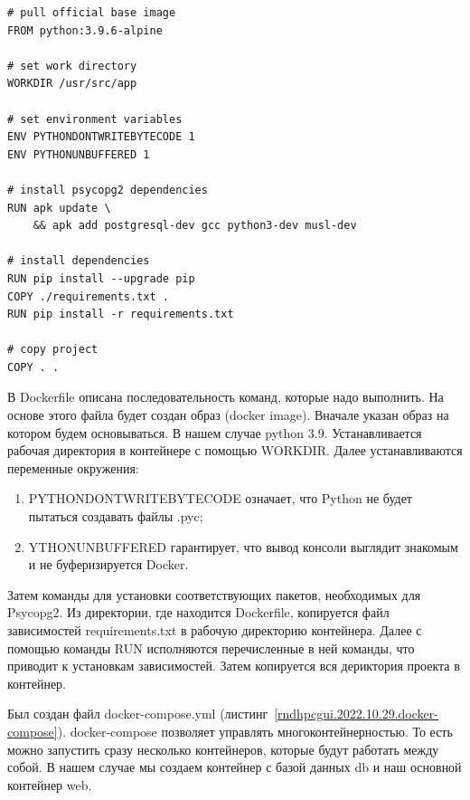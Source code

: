 \begin{lstlisting}[frame=single,label={rndhpcgui.2022.10.29.dockerfile},caption={Dockerfile},language={docker}] 
# pull official base image
FROM python:3.9.6-alpine

# set work directory
WORKDIR /usr/src/app

# set environment variables
ENV PYTHONDONTWRITEBYTECODE 1
ENV PYTHONUNBUFFERED 1

# install psycopg2 dependencies
RUN apk update \
    && apk add postgresql-dev gcc python3-dev musl-dev

# install dependencies
RUN pip install --upgrade pip
COPY ./requirements.txt .
RUN pip install -r requirements.txt

# copy project
COPY . .
\end{lstlisting}

В \textsf{Dockerfile} описана последовательность команд, которые надо выполнить. На основе этого файла будет создан образ (\textsf{docker image}). Вначале указан образ на котором будем основываться. В нашем случае \textsf{python 3.9}. Устанавливается рабочая директория в контейнере с помощью \textsf{WORKDIR}. Далее устанавливаются переменные окружения:

\begin{enumerate}
	\item \textsf{PYTHONDONTWRITEBYTECODE} означает, что \textsf{Python} не будет пытаться создавать файлы \textsf{.pyc};
	\item \textsf{YTHONUNBUFFERED} гарантирует, что вывод консоли выглядит знакомым и не буферизируется Docker.
\end{enumerate}

Затем команды для установки соответствующих пакетов, необходимых для \textsf{Psycopg2}. Из директории, где находится \textsf{Dockerfile}, копируется файл зависимостей \textsf{requirements.txt} в рабочую директорию контейнера. Далее с помощью команды \textsf{RUN} исполняются перечисленные в ней команды, что приводит к установкам зависимостей. Затем копируется вся дериктория проекта в контейнер. 

Был создан файл \textsf{docker-compose.yml} (листинг~\ref{rndhpcgui.2022.10.29.docker-compose}). \textsf{docker-compose} позволяет управлять многоконтейнерностью. То есть можно запустить сразу несколько контейнеров, которые будут работать между собой. В нашем случае мы создаем контейнер с базой данных \textsf{db} и наш основной контейнер \textsf{web}.

